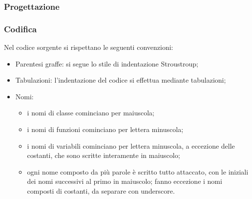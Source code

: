 \subsubsection{Progettazione}
\subsubsection{Codifica}
Nel codice sorgente si rispettano le seguenti convenzioni:
\begin{itemize}
	\item Parentesi graffe: si segue lo stile di indentazione Stroustroup;
	\item Tabulazioni: l'indentazione del codice si effettua mediante tabulazioni;
	\item Nomi: 
	\begin{itemize}
		\item i nomi di classe cominciano per maiuscola;
		\item i nomi di funzioni cominciano per lettera minuscola;
		\item i nomi di variabili cominciano per lettera minuscola, a eccezione delle costanti, che sono scritte interamente in maiuscolo;
		\item ogni nome composto da più parole è scritto tutto attaccato, con le iniziali dei nomi successivi al primo in maiuscolo; fanno 							eccezione i nomi composti di costanti, da separare con underscore.
	\end{itemize}
\end{itemize}
